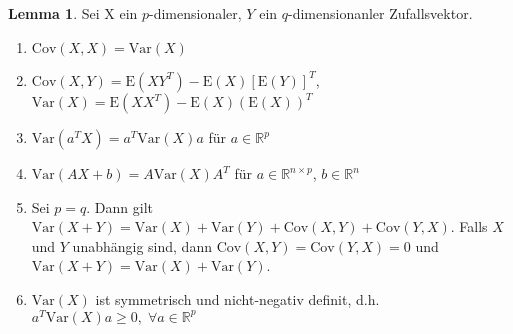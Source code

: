 \documentclass[12pt, a4paper]{article}
\newcommand{\E}{\mbox{I\negthinspace E}}
\theoremstyle{plain}
\theoremstyle{definition}
\newtheorem{lemma}[thm]{Lemma}
\newcommand{\R}{\mathbb{R}}
\newcommand{\1}{\mathds{1}}
\renewcommand{\E}{\mathrm{E}}
\newcommand{\Var}{\mathrm{Var}}
\newcommand{\Cov}{\mathrm{Cov}}
\begin{document}
\begin{lemma} Sei X ein $p$-dimensionaler, $Y$ ein $q$-dimensionanler Zufallsvektor.\\ \end{lemma}
\begin{enumerate}
\item $\Cov(X,X) = \Var(X)$\\
\item $\Cov(X,Y) = \E(XY^T) - \E(X)[\E(Y)]^T$, $\Var(X) = \E(XX^T)-\E(X)(\E(X))^T $\\
\item $\Var(a^T X) = a^T \Var(X) a$ für $a \in \R^p$\\
\item $\Var(AX + b) = A \Var(X) A^T$ für $a\in \R^{n\times p}$, $b \in \R^n$\\
\item Sei $p = q$. Dann gilt $\Var(X+Y) = \Var(X) + \Var(Y) + \Cov(X,Y) + \Cov(Y,X)$. Falls $X$ und $Y$ unabhängig sind, dann $\Cov(X,Y) = \Cov(Y,X) = 0$ und $\Var(X+Y) = \Var(X) + \Var(Y)$.\\
\item $\Var(X)$ ist symmetrisch und nicht-negativ definit, d.h. $a^T \Var(X)a \geq 0, \; \forall a\in \R^p$\\
\end{enumerate}
\end{document}
